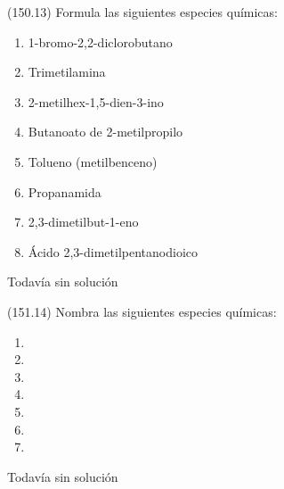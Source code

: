 \documentclass[10pt,a5paper,twoside]{article}
\begin{document}
  \begin{exercise}[
      tags    = {},
      topics  = {química, química orgánica, orgánica},
      source  = {FQ 1B MGH 2016, p150, e13},
    ]
    (150.13) Formula las siguientes especies químicas:
    \begin{enumerate}
      \item 1-bromo-2,2-diclorobutano
      \item Trimetilamina
      \item 2-metilhex-1,5-dien-3-ino
      \item Butanoato de 2-metilpropilo
      \item Tolueno (metilbenceno)
      \item Propanamida
      \item 2,3-dimetilbut-1-eno
      \item Ácido 2,3-dimetilpentanodioico
    \end{enumerate}
  \end{exercise}

  \begin{solution}[print=false]
    Todavía sin solución
  \end{solution}




  \begin{exercise}[
      tags    = {},
      topics  = {química, química orgánica, orgánica},
      source  = {FQ 1B MGH 2016, p151, e14},
    ]
    (151.14) Nombra las siguientes especies químicas:
    \begin{enumerate}
      \item {}
      \item {}
      \item {}
      \item {}
      \item {}
      \item {}
      \item {}
    \end{enumerate}
  \end{exercise}

  \begin{solution}[print=false]
    Todavía sin solución
  \end{solution}
\end{document}
